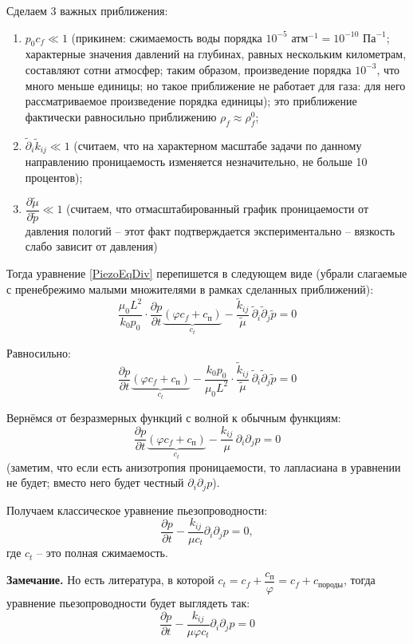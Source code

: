 \documentclass[a4paper,14pt]{extarticle}
\newcommand{\beq}{\begin{equation}}
\newcommand{\eeq}{\end{equation}}
\begin{document}
Сделаем 3 важных приближения:
\begin{enumerate}
	\item $p_0 c_f\ll 1$ (прикинем: сжимаемость воды порядка $10^{-5}\text{ атм}^{-1}=10^{-10}\text{ Па}^{-1}$; характерные значения давлений на глубинах, равных нескольким километрам, составляют сотни атмосфер; таким образом, произведение порядка $10^{-3}$, что много меньше единицы; но такое приближение не работает для газа: для него рассматриваемое произведение порядка единицы); это приближение фактически равносильно приближению $\rho_f\approx\rho_f^0$;
	\item $\tilde{\partial}_i\tilde{k}_{ij}\ll 1$ (считаем, что на характерном масштабе задачи по данному направлению проницаемость изменяется незначительно, не больше 10 процентов);
	\item $\dfrac{\partial\tilde{\mu}}{\partial\tilde{p}}\ll 1$ (считаем, что отмасштабированный график проницаемости от давления пологий -- этот факт подтверждается экспериментально -- вязкость слабо зависит от давления)
\end{enumerate}

Тогда уравнение \eqref{PiezoEqDiv} перепишется в следующем виде (убрали слагаемые с пренебрежимо малыми множителями в рамках сделанных приближений):
\beq
\frac{\mu_0L^2}{k_0p_0}\cdot\frac{\partial p}{\partial t}\underbrace{\left(\varphi c_{\!f}+c_\text{п}\right)}_{c_t}-\frac{\tilde{k}_{ij}}{\tilde{\mu}}\,\tilde{\partial}_i\tilde{\partial}_{\!j} \tilde{p}=0
\eeq

Равносильно:
\beq
\frac{\partial p}{\partial t}\underbrace{\left(\varphi c_{\!f}+c_\text{п}\right)}_{c_t}-\frac{k_0p_0}{\mu_0L^2}\cdot\frac{\tilde{k}_{ij}}{\tilde{\mu}}\,\tilde{\partial}_i\tilde{\partial}_{\!j} \tilde{p}=0
\eeq

Вернёмся от безразмерных функций с волной к обычным функциям:
\beq
\frac{\partial p}{\partial t}\underbrace{\left(\varphi c_{\!f}+c_\text{п}\right)}_{c_t}-\frac{k_{ij}}{\mu}\,\partial_i\partial_{\!j} p=0
\eeq
(заметим, что если есть анизотропия проницаемости, то лапласиана в уравнении не будет; вместо него будет честный $\partial_i\partial_{\!j}p$).


Получаем классическое уравнение пьезопроводности:
\beq
\frac{\partial p}{\partial t}-\frac{k_{ij}}{\mu c_t}\partial_i\partial_{\!j} p=0,
\eeq
где $c_t$ -- это полная сжимаемость.

\textbf{Замечание.} Но есть литература, в которой $c_t=c_{\!f}+\dfrac{c_\text{п}}{\varphi}=c_{\!f}+c_{\text{породы}}$, тогда уравнение пьезопроводности будет выглядеть так:
\beq
\frac{\partial p}{\partial t}-\frac{k_{ij}}{\mu\varphi c_t}\partial_i\partial_{\!j} p=0
\eeq
\end{document}
